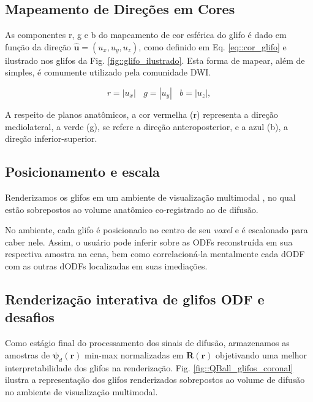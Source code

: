 \documentclass[
    12pt,                %
    oneside,            %
    a4paper,            %
    english,            %
    french,                %
    spanish,            %
    brazil                %
    ]{abntex2}
\begin{document}
\subsection{Mapeamento de Direções em Cores}

As componentes r, g e b do mapeamento de cor esférica do glifo é dado em função da direção $\mathbf{\hat{u}} = (u_x, u_y, u_z)$, como definido em Eq. \ref{eq::cor_glifo} e ilustrado nos glifos da Fig. \ref{fig::glifo_ilustrado}. Esta forma de mapear, além de simples, é comumente utilizado pela comunidade DWI. %

\begin{equation}
\label{eq::cor_glifo}
    r = |u_x| ~~~~ g = |u_y| ~~~~ b = |u_z|, 
\end{equation}


A respeito de planos anatômicos, a cor vermelha (r) representa a direção mediolateral, a verde (g), se refere a direção anteroposterior, e a azul (b), a direção inferior-superior.

\subsection{Posicionamento e escala}

Renderizamos os glifos em um ambiente de visualização multimodal \cite{VMTKNeuro}, no qual estão sobrepostos ao volume anatômico co-registrado ao de difusão.

No ambiente, cada glifo é posicionado no centro de seu \textit{voxel} e é escalonado para caber nele. Assim, o usuário pode inferir sobre as ODFs reconstruída em sua respectiva amostra na cena, bem como correlacioná-la mentalmente cada dODF com as outras dODFs localizadas em suas imediações.

\subsection{Renderização interativa de glifos ODF e desafios}

Como estágio final do processamento dos sinais de difusão, armazenamos as amostras de $\boldsymbol{\psi}_d(\mathbf{r})$ min-max normalizadas em $\boldsymbol{R}(\mathbf{r})$ objetivando uma melhor interpretabilidade dos glifos na renderização. Fig. \ref{fig::QBall_glifos_coronal} ilustra a representação dos glifos renderizados sobrepostos ao volume de difusão no ambiente de visualização multimodal.
\end{document}
